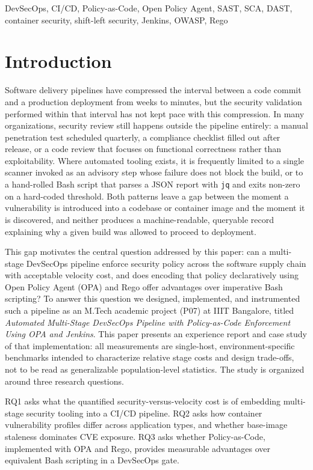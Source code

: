 \documentclass[conference]{IEEEtran}
\begin{document}
\begin{IEEEkeywords}
DevSecOps, CI/CD, Policy-as-Code, Open Policy Agent, SAST, SCA, DAST, container security, shift-left security, Jenkins, OWASP, Rego
\end{IEEEkeywords}

\section{Introduction}
\label{sec:intro}

Software delivery pipelines have compressed the interval between a code commit and a production deployment from weeks to minutes, but the security validation performed within that interval has not kept pace with this compression. In many organizations, security review still happens outside the pipeline entirely: a manual penetration test scheduled quarterly, a compliance checklist filled out after release, or a code review that focuses on functional correctness rather than exploitability. Where automated tooling exists, it is frequently limited to a single scanner invoked as an advisory step whose failure does not block the build, or to a hand-rolled Bash script that parses a JSON report with \texttt{jq} and exits non-zero on a hard-coded threshold. Both patterns leave a gap between the moment a vulnerability is introduced into a codebase or container image and the moment it is discovered, and neither produces a machine-readable, queryable record explaining why a given build was allowed to proceed to deployment.

This gap motivates the central question addressed by this paper: can a multi-stage DevSecOps pipeline enforce security policy across the software supply chain with acceptable velocity cost, and does encoding that policy declaratively using Open Policy Agent (OPA) and Rego offer advantages over imperative Bash scripting? To answer this question we designed, implemented, and instrumented such a pipeline as an M.Tech academic project (P07) at IIIT Bangalore, titled \emph{Automated Multi-Stage DevSecOps Pipeline with Policy-as-Code Enforcement Using OPA and Jenkins}. This paper presents an experience report and case study of that implementation: all measurements are single-host, environment-specific benchmarks intended to characterize relative stage costs and design trade-offs, not to be read as generalizable population-level statistics. The study is organized around three research questions.

RQ1 asks what the quantified security-versus-velocity cost is of embedding multi-stage security tooling into a CI/CD pipeline. RQ2 asks how container vulnerability profiles differ across application types, and whether base-image staleness dominates CVE exposure. RQ3 asks whether Policy-as-Code, implemented with OPA and Rego, provides measurable advantages over equivalent Bash scripting in a DevSecOps gate.
\end{document}
